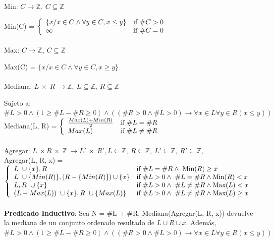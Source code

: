 \documentclass{article}
\theoremstyle{definition}
\theoremstyle{remark}
\begin{document}
    Min: $C \rightarrow \mathds{Z} , \  C \subseteq \mathds{Z} $  
    
    Min(C) = $\left\{ \begin{array}{ll}  \{x / x \in C  \wedge \forall y \in C, x \leq y\}  & \mbox{if } \#C > 0 \\ \infty & \mbox{if } \#C = 0 \\ \end{array} \right.$ \\ \\

    Max: $C \rightarrow \mathds{Z} , \  C \subseteq \mathds{Z} $ 
    
    Max(C) = $\{x / x \in C  \wedge \forall y \in C, x \geq y\}$ \\ \\

    Mediana: $L \  \times\  R \  \rightarrow \mathds{Z}, \ L \subseteq \mathds{Z}, \ R \subseteq \mathds{Z}$
    
    Sujeto a:  $\#L > 0  \wedge  (1 \geq \#L - \#R \geq 0) \wedge ((\#R > 0 \wedge \#L > 0) \rightarrow \forall x \in L \forall y \in R (x \leq y) )$ \\ 
    
    Mediana(L, R) = $\left\{ \begin{array}{ll}  \frac{Max(L) + Min(R)}{2}  & \mbox{if } \#L = \#R \\ Max(L) & \mbox{if } \#L \neq \#R \\ \end{array} \right.$\\ \\

    
    
    Agregar: $L\ \times R\ \times\ \mathds{Z}\ \rightarrow L'\  \times\  R', L \subseteq \mathds{Z}, \ R \subseteq \mathds{Z}, \ L' \subseteq \mathds{Z}, \ R' \subseteq \mathds{Z}, \ $\\
    
    Agregar(L, R, x) = $\left\{ \begin{array}{ll}  L  \ \cup \{x\}, R & \mbox{if } \#L = \#R   \wedge \ \text{Min}(R) \geq x \\  L  \ \cup \{Min(R)\}, (R - \{Min(R)\}) \cup \{x\} & \mbox{if }  \#L > 0  \wedge \ \#L = \#R \wedge \text{Min}(R) < x \\ L, R \ \cup \{x\} & \mbox{if } \#L > 0  \wedge \ \#L \neq \#R \wedge \text{Max}(L) < x \\ (L - Max(L)) \ \cup \{x\}, R \ \cup \{Max(L)\}  & \mbox{if } \#L > 0  \wedge \ \#L \neq \#R \wedge \text{Max}(L) \geq x \\ \end{array} \right.$\\
      \\
          
\textbf{Predicado Inductivo}: Sea N = \#L + \#R. Mediana(Agregar(L, R, x)) devuelve la mediana de un conjunto ordenado resultado  de ${L} \cup {R} \cup {x}$. Además, $\#L > 0  \wedge  (1 \geq \#L - \#R \geq 0) \wedge ((\#R > 0 \wedge \#L > 0) \rightarrow \forall x \in L \forall y \in R (x \leq y) )$ \\ 
    
\end{document}

